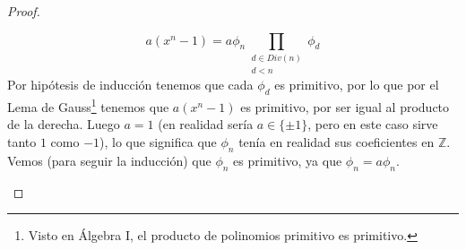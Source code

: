 \begin{prop}
\begin{proof}
\begin{itemize}
                \begin{equation*}
                    a(x^n-1) = a\phi_n \prod_{\substack{d\in Div(n)\\d<n}}\phi_d
                \end{equation*}
                Por hipótesis de inducción tenemos que cada $\phi_d$ es primitivo, por lo que por el Lema de Gauss\footnote{Visto en Álgebra I, el producto de polinomios primitivo es primitivo.} tenemos que $a(x^n-1)$ es primitivo, por ser igual al producto de la derecha. Luego $a=1$ (en realidad sería $a\in \{\pm 1\}$, pero en este caso sirve tanto $1$ como $-1$), lo que significa que $\phi_n$ tenía en realidad sus coeficientes en $\mathbb{Z}$. Vemos (para seguir la inducción) que $\phi_n$ es primitivo, ya que $\phi_n = a\phi_n$.
        \end{itemize}
    \end{proof}
\end{prop}

